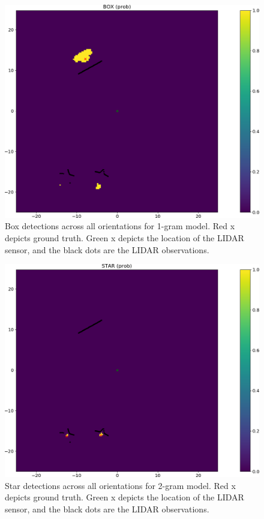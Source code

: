 %
\begin{figure}
  \centering
  \includegraphics[width=\columnwidth]{figures/box_1gram.png}
  \caption{Box detections across all orientations for 1-gram model. Red x
    depicts ground truth. Green x depicts the location of the LIDAR sensor, and
    the black dots are the LIDAR observations.}
  \label{fig:box_1gram}
\end{figure}
%
\begin{figure}
  \centering
  \includegraphics[width=\columnwidth]{figures/star_2gram.png}
  \caption{Star detections across all orientations for 2-gram model. Red x
    depicts ground truth. Green x depicts the location of the LIDAR sensor, and
    the black dots are the LIDAR observations.}
  \label{fig:star_2gram}
\end{figure}
